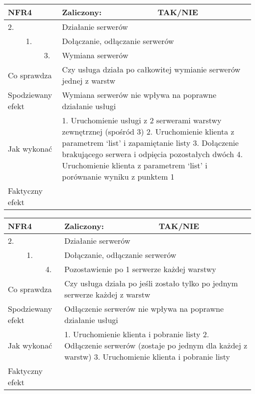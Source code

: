 \begin{tabular}{|p{20pt}|p{20pt}|p{20pt}|p{250pt}|p{60pt}|}
	\hline
	\multicolumn{3}{|p{70pt}|}{NFR4} & Zaliczony: & TAK/NIE \\ \hline
	2. & & & \multicolumn{2}{|p{310pt}|}{Działanie serwerów } \\ \hline
	& 1. & & \multicolumn{2}{|p{310pt}|}{Dołączanie, odłączanie serwerów } \\ \hline
	& & 3. & \multicolumn{2}{|p{310pt}|}{Wymiana serwerów } \\ \hline
	\multicolumn{3}{|p{70pt}|}{Co sprawdza} & \multicolumn{2}{|p{310pt}|}{Czy usługa działa po całkowitej wymianie serwerów jednej z warstw} \\ \hline
	\multicolumn{3}{|p{70pt}|}{Spodziewany efekt} & \multicolumn{2}{|p{310pt}|}{Wymiana serwerów nie wpływa na poprawne działanie usługi} \\ \hline
	\multicolumn{3}{|p{70pt}|}{Jak wykonać} & \multicolumn{2}{|p{310pt}|}{1. Uruchomienie usługi z 2 serwerami warstwy zewnętrznej (spośród 3)
2. Uruchomienie klienta z parametrem ‘list’ i zapamiętanie listy
3. Dołączenie brakującego serwera i odpięcia pozostałych dwóch
4. Uruchomienie klienta z parametrem ‘list’ i porównanie wyniku z punktem 1} \\ \hline
	\multicolumn{3}{|p{70pt}|}{Faktyczny efekt} & \multicolumn{2}{|p{310pt}|}{} \\ \hline
\end{tabular}

\begin{tabular}{|p{20pt}|p{20pt}|p{20pt}|p{250pt}|p{60pt}|}
	\hline
	\multicolumn{3}{|p{70pt}|}{NFR4} & Zaliczony: & TAK/NIE \\ \hline
	2. & & & \multicolumn{2}{|p{310pt}|}{Działanie serwerów } \\ \hline
	& 1. & & \multicolumn{2}{|p{310pt}|}{Dołączanie, odłączanie serwerów } \\ \hline
	& & 4. & \multicolumn{2}{|p{310pt}|}{Pozostawienie po 1 serwerze każdej warstwy } \\ \hline
	\multicolumn{3}{|p{70pt}|}{Co sprawdza} & \multicolumn{2}{|p{310pt}|}{Czy usługa działa po jeśli zostało tylko po jednym serwerze każdej z warstw} \\ \hline
	\multicolumn{3}{|p{70pt}|}{Spodziewany efekt} & \multicolumn{2}{|p{310pt}|}{Odłączenie serwerów nie wpływa na poprawne działanie usługi} \\ \hline
	\multicolumn{3}{|p{70pt}|}{Jak wykonać} & \multicolumn{2}{|p{310pt}|}{1. Uruchomienie klienta i pobranie listy
2. Odłączenie serwerów (zostaje po jednym dla każdej z warstw)
3. Uruchomienie klienta i pobranie listy} \\ \hline
	\multicolumn{3}{|p{70pt}|}{Faktyczny efekt} & \multicolumn{2}{|p{310pt}|}{} \\ \hline
\end{tabular}

